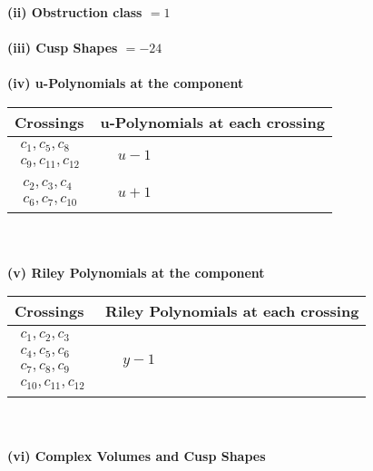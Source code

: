 \documentclass[1p]{elsarticle_modified}
\theoremstyle{definition}
\begin{document}
\flushleft \textbf{(ii) Obstruction class $= 1$}\\~\\
\flushleft \textbf{(iii) Cusp Shapes $= -24$}\\~\\
\newpage\renewcommand{\arraystretch}{1}
\flushleft \textbf{(iv) u-Polynomials at the component}\newline \\
\begin{tabular}{m{50pt}|m{274pt}}
Crossings & \hspace{64pt}u-Polynomials at each crossing \\
\hline $$\begin{aligned}c_{1},c_{5},c_{8}\\c_{9},c_{11},c_{12}\end{aligned}$$&$\begin{aligned}
&u-1
\end{aligned}$\\
\hline $$\begin{aligned}c_{2},c_{3},c_{4}\\c_{6},c_{7},c_{10}\end{aligned}$$&$\begin{aligned}
&u+1
\end{aligned}$\\
\hline
\end{tabular}\\~\\
\newpage\renewcommand{\arraystretch}{1}
\flushleft \textbf{(v) Riley Polynomials at the component}\newline \\
\begin{tabular}{m{50pt}|m{274pt}}
Crossings & \hspace{64pt}Riley Polynomials at each crossing \\
\hline $$\begin{aligned}c_{1},c_{2},c_{3}\\c_{4},c_{5},c_{6}\\c_{7},c_{8},c_{9}\\c_{10},c_{11},c_{12}\end{aligned}$$&$\begin{aligned}
&y-1
\end{aligned}$\\
\hline
\end{tabular}\\~\\
\newpage\flushleft \textbf{(vi) Complex Volumes and Cusp Shapes}
\end{document}
